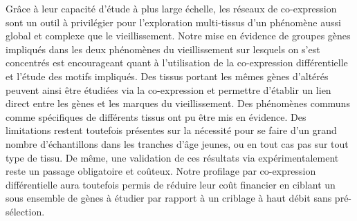 Grâce à leur capacité d'étude à plus large échelle, les réseaux de co-expression sont un outil à privilégier pour l'exploration multi-tissus d'un phénomène aussi global et complexe que le vieillissement. Notre mise en évidence de groupes gènes impliqués dans les deux phénomènes du vieillissement sur lesquels on s'est concentrés est encourageant quant à l'utilisation de la co-expression différentielle et l'étude des motifs impliqués. Des tissus portant les mêmes gènes d'altérés peuvent ainsi être étudiées via la co-expression et permettre d'établir un lien direct entre les gènes et les marques du vieillissement. Des phénomènes communs comme spécifiques de différents tissus ont pu être mis en évidence. Des limitations restent toutefois présentes sur la nécessité pour se faire d'un grand nombre d'échantillons dans les tranches d'âge jeunes, ou en tout cas pas sur tout type de tissu. 
De même, une validation de ces résultats via expérimentalement reste un passage obligatoire et coûteux. Notre profilage par co-expression différentielle aura toutefois permis de réduire leur coût financier en ciblant un sous ensemble de gènes à étudier par rapport à un criblage à haut débit sans pré-sélection.








